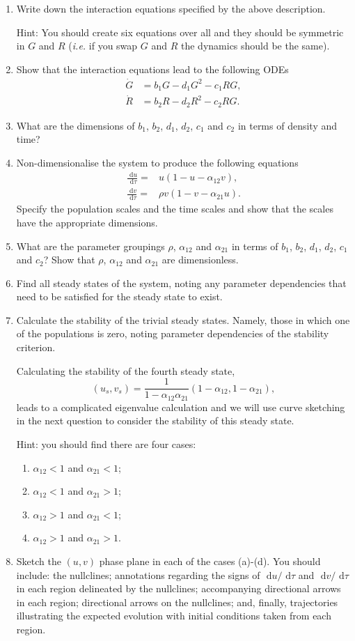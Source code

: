 \documentclass[]{article}
\newcommand{\bb}{\begin{equation}}
\newcommand{\ee}{\end{equation}}
\newcommand{\rd}{\text{ d}}
\newcommand{\ie}{\emph{i.e.} }
\begin{document}
\begin{enumerate}
\item Write down the interaction equations specified by the above description.

Hint: You should create six equations over all and they should be symmetric in $G$ and $R$ (\ie if you swap $G$ and $R$ the dynamics should be the same).
\item Show that the interaction equations lead to the following ODEs
\begin{align}
\dot{G}&=b_1G-d_1G^2-c_1RG,\\
\dot{R}&=b_2R-d_2R^2-c_2RG.
\end{align}

\item What are the dimensions of $b_1$, $b_2$, $d_1$, $d_2$, $c_1$ and $c_2$ in terms of density and time?
\item Non-dimensionalise the system to produce the following equations
\begin{align}
\frac{\rd u}{\rd \tau}=&u(1-u-\alpha_{12}v),\\
\frac{\rd v}{\rd \tau}=&\rho v(1-v-\alpha_{21}u).
\end{align}
Specify the population scales and the time scales and show that the scales have the appropriate dimensions.
\item What are the parameter groupings $\rho$, $\alpha_{12}$ and $\alpha_{21}$ in terms of $b_1$, $b_2$, $d_1$, $d_2$, $c_1$ and $c_2$? Show that $\rho$, $\alpha_{12}$ and $\alpha_{21}$ are dimensionless.
\item Find all steady states of the system, noting any parameter dependencies that need to be satisfied for the steady state to exist.
\item Calculate the stability of the trivial steady states. Namely, those in which one of the populations is zero, noting parameter dependencies of the stability criterion.

Calculating the stability of the fourth steady state,
\bb
(u_s,v_s)=\frac{1}{1-\alpha_{12}\alpha_{21}}(1-\alpha_{12},1-\alpha_{21}),
\ee
leads to a complicated eigenvalue calculation and we will use curve sketching in the next question to consider the stability of this steady state.

Hint: you should find there are four cases:
\begin{enumerate}
\item $\alpha_{12}<1$ and $\alpha_{21}<1$; \item $\alpha_{12}<1$ and $\alpha_{21}>1$;
\item $\alpha_{12}>1$ and $\alpha_{21}<1$;
\item $\alpha_{12}>1$ and $\alpha_{21}>1$.
\end{enumerate}
\item Sketch the $(u,v)$ phase plane in each of the cases (a)-(d). You should include: the nullclines; annotations regarding the signs of $\rd u/\rd \tau$ and $\rd v/\rd \tau$ in each region delineated by the nullclines; accompanying directional arrows in each region; directional arrows on the nullclines; and, finally, trajectories illustrating the expected evolution with initial conditions taken from each region.


\end{enumerate}
\end{document}
